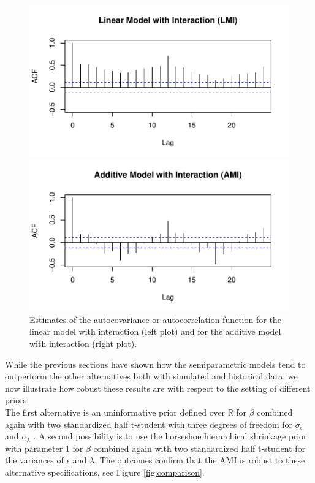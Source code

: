 \documentclass{article}\usepackage[]{graphicx}\usepackage[]{color}
\begin{document}
\begin{figure}[H]
\begin{minipage}{.5\textwidth}
\centering 
\includegraphics[scale=.5]{Residuals_LM_ST.pdf}
\end{minipage}
\begin{minipage}{.5\textwidth}
\centering 
\includegraphics[scale=.5]{Residuals_AM_ST.pdf}
\end{minipage}
\caption{Estimates of the autocovariance or autocorrelation function for the linear model with interaction (left plot) and for the additive model with interaction (right plot).}
\label{fig:residuals}
\end{figure}

While the previous sections have shown how the semiparametric models tend to outperform the other alternatives both with simulated and historical data, we now illustrate how robust these results are with respect to the setting of different priors. \\
The first alternative is an uninformative prior defined over $ \mathbb{R} $ for $ \beta $ combined again with two standardized half t-student with three degrees of freedom for $\sigma_{\epsilon}$ and $\sigma_{\lambda}$ \cite{buerkner2016package}. A second possibility is to use the horseshoe hierarchical shrinkage prior with parameter 1 for $ \beta $ combined again with two standardized half t-student for the variances of $ \epsilon $ and $ \lambda $. The outcomes confirm that the AMI is robust to these alternative specifications, see Figure \ref{fig:comparison}.
\end{document}
